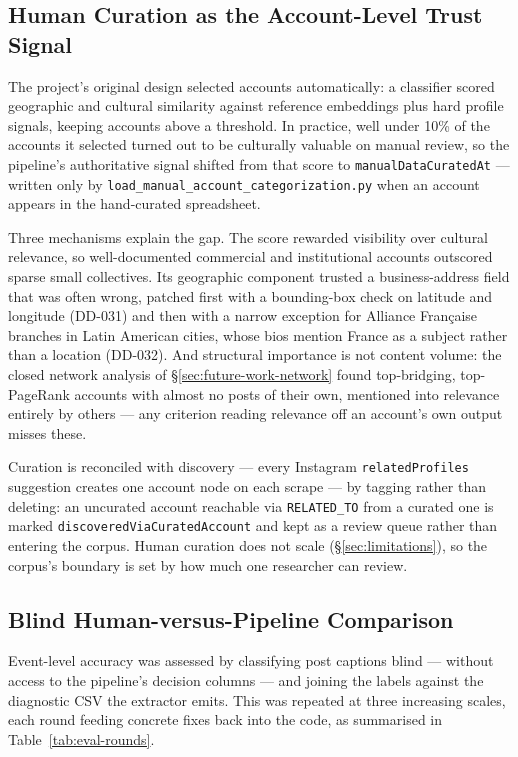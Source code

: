 \documentclass[12pt, a4paper]{report}
\begin{document}
\subsection{Human Curation as the Account-Level Trust Signal}
\label{sec:methodology-curation}

The project's original design selected accounts automatically: a
classifier scored geographic and cultural similarity against reference
embeddings plus hard profile signals, keeping accounts above a
threshold. In practice, well under 10\% of the accounts it selected
turned out to be culturally valuable on manual review, so the pipeline's
authoritative signal shifted from that score to
\texttt{manualDataCuratedAt} — written only by
\texttt{load\_manual\_account\_categorization.py} when an account
appears in the hand-curated spreadsheet.

Three mechanisms explain the gap. The score rewarded visibility over
cultural relevance, so well-documented commercial and institutional
accounts outscored sparse small collectives. Its geographic component
trusted a business-address field that was often wrong, patched first
with a bounding-box check on latitude and longitude (DD-031) and then
with a narrow exception for Alliance Française branches in Latin
American cities, whose bios mention France as a subject rather than a
location (DD-032). And structural importance is not content volume: the
closed network analysis of \S\ref{sec:future-work-network} found
top-bridging, top-PageRank accounts with almost no posts of their own,
mentioned into relevance entirely by others — any criterion reading
relevance off an account's own output misses these.

Curation is reconciled with discovery — every Instagram
\texttt{relatedProfiles} suggestion creates one account node on each
scrape — by tagging rather than deleting: an uncurated account reachable
via \texttt{RELATED\_TO} from a curated one is marked
\texttt{discoveredViaCuratedAccount} and kept as a review queue rather
than entering the corpus. Human curation does not scale
(\S\ref{sec:limitations}), so the corpus's boundary is set by how much
one researcher can review.

\subsection{Blind Human-versus-Pipeline Comparison}
\label{sec:eval-design}

Event-level accuracy was assessed by classifying post captions blind —
without access to the pipeline's decision columns — and joining the
labels against the diagnostic CSV the extractor emits. This was repeated
at three increasing scales, each round feeding concrete fixes back into
the code, as summarised in Table~\ref{tab:eval-rounds}.
\end{document}
